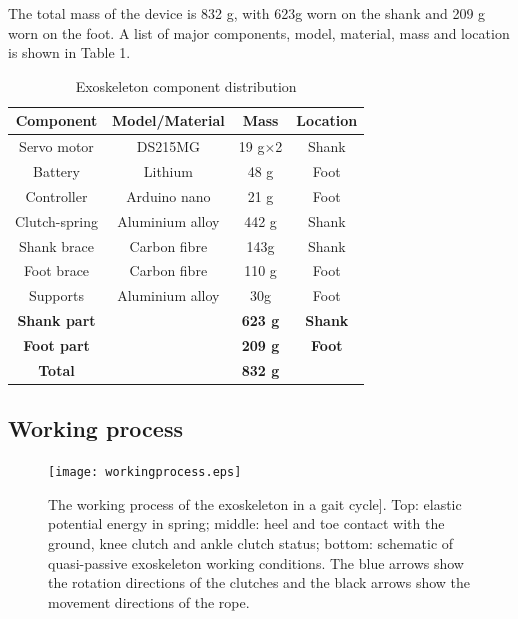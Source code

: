 \documentclass[twocolumn,cleanfoot,10pt]{asme2ej}
\begin{document}
The total mass of the device is 832 g, with 623g worn on the shank and 209 g worn on the foot. A list of major components, model, material, mass and location is shown in
Table 1.  


\begin{table}[t]
	\caption{Exoskeleton component distribution}
	\begin{center}
		\label{tab:hardware}
		\begin{tabular}{c c c c}	
			\hline
			\textbf{Component} & \textbf{Model/Material} & \textbf{Mass} & \textbf{Location} \\
			\hline
			Servo motor & DS215MG & 19 g$\times$2 & Shank\\
			Battery & Lithium & 48 g & Foot\\
			Controller & Arduino nano & 21 g & Foot\\
			Clutch-spring & Aluminium alloy & 442 g & Shank\\
			Shank brace & Carbon fibre & 143g & Shank\\
			Foot brace & Carbon fibre & 110 g & Foot\\
			Supports & Aluminium alloy & 30g & Foot\\			
			\hline 
			\textbf{Shank part} & & \textbf{623 g} & \textbf{Shank}\\
			\textbf{Foot part} & & \textbf{209 g} & \textbf{Foot}\\
			\hline
			\textbf{Total} & & \textbf{832 g} & \\
			\hline
			
		\end{tabular}
	\end{center}
\end{table}



\subsection{Working process}
\label{subsec:Working process}

\begin{figure}[tb]
	\centering
	\texttt{[image: workingprocess.eps]}
	\caption{The working process of the exoskeleton in a gait cycle]. Top: elastic potential energy in spring; middle: heel and toe contact with the ground, knee clutch and ankle clutch status; bottom: schematic of quasi-passive exoskeleton working conditions. The blue arrows show the rotation directions of the clutches and the black arrows show the movement directions of the rope.}
	\label{fig:workprocess}   
\end{figure}
\end{document}
